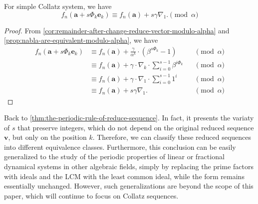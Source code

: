\begin{theorem}\label{thm:simple-collatz-system-mod-eq-plus-s-gamma-nabla_1}
    For simple Collatz system, we have
    \[ f_{n}(\bm{a} + s\Phi_k\bm{e}_k) \equiv f_{n}(\bm{a}) + s\gamma\nabla_1.\pmod{\alpha} \]
\end{theorem}
\begin{proof}
    From \cref{cor:remainder-after-change-reduce-vector-modulo-alpha} and \cref{prop:nabla-are-equivalent-modulo-alpha}, we have
    \begin{align*}
        f_{n}(\bm{a} + s\Phi_k\bm{e}_k) &\equiv f_{n}(\bm{a}) + \frac{\gamma}{\alpha^{k}}\cdot(\beta^{s\Phi_k} - 1) &&\pmod{\alpha}\\
        &\equiv f_{n}(\bm{a}) + \gamma\cdot\nabla_{k}\cdot\sum_{i=0}^{s-1}\beta^{i\Phi_k} &&\pmod{\alpha} \\
        &\equiv f_{n}(\bm{a}) + \gamma\cdot\nabla_1\cdot\sum_{i=0}^{s-1} 1^{i} &&\pmod{\alpha} \\
        &\equiv f_{n}(\bm{a}) + s\gamma\nabla_1. &&\pmod{\alpha}
    \end{align*}
\end{proof}

Back to \cref{thm:the-periodic-rule-of-reduce-sequence}. In fact, it presents the variaty of $s$ that preserve integers, which do not depend on the original reduced sequence $\bm{v}$, but only on the position $k$.
Therefore, we can classify these reduced sequences into different equivalence classes.
Furthermore, this conclusion can be easily generalized to the study of the periodic properties of linear or fractional dynamical systems in other algebraic fields, simply by replacing the prime factors with ideals and the LCM with the least common ideal, while the form remains essentially unchanged.
However, such generalizations are beyond the scope of this paper, which will continue to focus on Collatz sequences.
